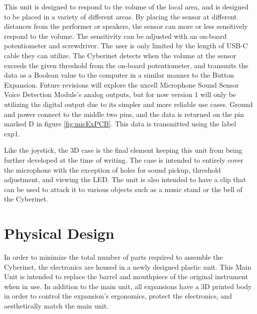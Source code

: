 This unit is designed to respond to the volume of the local area, and is designed to be placed in a variety of different areas. By placing the sensor at different distances from the performer or speakers, the sensor can more or less sensitively respond to the volume. The sensitivity can be adjusted with an on-board potentiometer and screwdriver. The user is only limited by the length of USB-C cable they can utilize. The Cyberinet detects when the volume at the sensor exceeds the given threshold from the on-board potentiometer, and transmits the data as a Boolean value to the computer in a similar manner to the Button Expansion. Future revisions will explore the uxcell Microphone Sound Sensor Voice Detection Module's analog outputs, but for now version 1 will only be utilizing the digital output due to its simpler and more reliable use cases. Ground and power connect to the middle two pins, and the data is returned on the pin marked D in figure \ref{fig:micExPCB}. This data is transmitted using the label exp1. 

Like the joystick, the 3D case is the final element keeping this unit from being further developed at the time of writing. The case is intended to entirely cover the microphone with the exception of holes for sound pickup, threshold adjustment, and viewing the LED. The unit is also intended to have a clip that can be used to attack it to various objects such as a music stand or the bell of the Cyberinet.

\section{Physical Design}
In order to minimize the total number of parts required to assemble the Cyberinet, the electronics are housed in a newly designed plastic unit. This Main Unit is intended to replace the barrel and mouthpiece of the original instrument when in use. In addition to the main unit, all expansions have a 3D printed body in order to control the expansion's ergonomics, protect the electronics, and aesthetically match the main unit.


